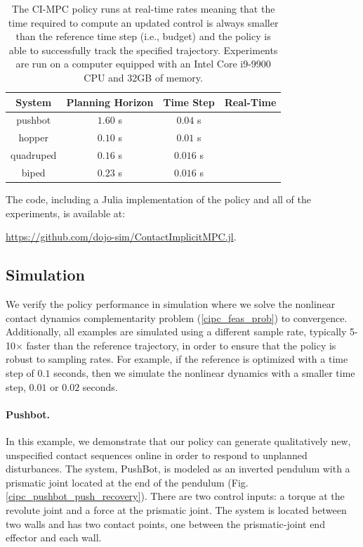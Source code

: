 \begin{table}[H]
	\centering
	\caption[CI-MPC real-time performance in simulation]{The CI-MPC policy runs at real-time rates meaning that the time required to compute an updated control is always smaller than the reference time step (i.e., budget) and the policy is able to successfully track the specified trajectory. Experiments are run on a computer equipped with an Intel Core i9-9900 CPU and 32GB of memory.}
	\begin{tabular}{c c c c}
		\toprule
		\textbf{System} &
		\textbf{Planning Horizon} &
		\textbf{Time Step} & 
		\textbf{Real-Time} \\
		\toprule
		pushbot          & $1.60$ s & $0.04$ s & \checkmark \\ 
		hopper           & $0.10$ s & $0.01$ s & \checkmark \\ 
		quadruped        & $0.16$ s & $0.016$ s & \checkmark \\
		biped            & $0.23$ s & $0.016$ s & \checkmark \\
		\toprule
	\end{tabular}
	\label{cipc_timing_table}
\end{table}

The code, including a Julia implementation of the policy and all of the experiments, is available at: 
\begin{center}
	\url{https://github.com/dojo-sim/ContactImplicitMPC.jl}.
\end{center}
 
\subsection{Simulation}
We verify the policy performance in simulation  where we solve the nonlinear contact dynamics complementarity problem (\ref{cipc_feas_prob}) to convergence. Additionally, all examples are simulated using a different sample rate, typically 5-10$\times$ faster than the reference trajectory, in order to ensure that the policy is robust to sampling rates. For example, if the reference is optimized with a time step of $0.1$ seconds, then we simulate the nonlinear dynamics with a smaller time step, $0.01$ or $0.02$ seconds.

\paragraph{Pushbot.}
In this example, we demonstrate that our policy can generate qualitatively new, unspecified contact sequences online in order to respond to unplanned disturbances. The system, PushBot, is modeled as an inverted pendulum with a prismatic joint located at the end of the pendulum (Fig. \ref{cipc_pushbot_push_recovery}). There are two control inputs: a torque at the revolute joint and a force at the prismatic joint. The system is located between two walls and has two contact points, one between the prismatic-joint end effector and each wall.

